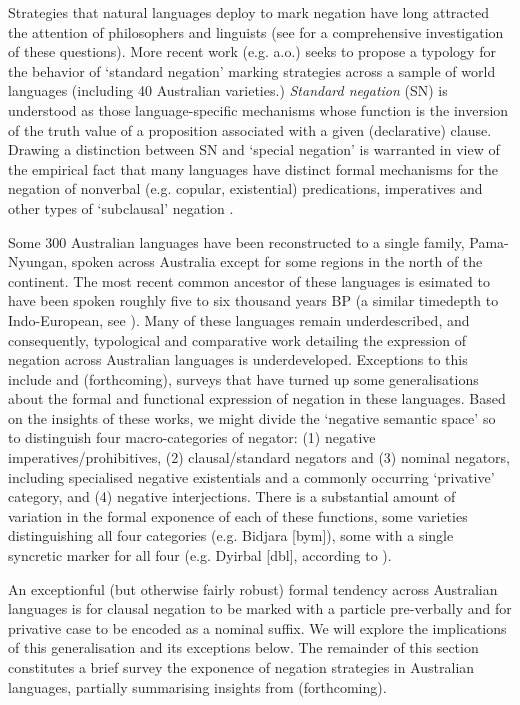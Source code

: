 \documentclass[usenames,dvipsnames,11pt]{article}
\begin{document}
{Strategies that natural languages deploy to mark negation have long attracted the attention of philosophers and linguists (see \citealt{Horn1989} for a comprehensive investigation of these questions). More recent work (e.g. \citealt{Miestamo2005} a.o.) seeks to propose a typology for the behavior of `standard negation' marking strategies across a sample of world languages (including 40 Australian varieties.) \textit{Standard negation} (SN) is understood as those language-specific mechanisms whose function is the inversion of the truth value of a proposition associated with a given (declarative) clause. Drawing a distinction between SN and `special negation' is warranted in view of the empirical fact that many languages have distinct formal mechanisms for the negation of nonverbal (e.g. copular, existential) predications, imperatives and other types of `subclausal' negation \citep{Miestamo2007,Horn2017,Veselinova2013,VanderAuwera2005}.


Some 300 Australian languages have been reconstructed to a single family, Pama-Nyungan, spoken across Australia except for some regions in the north of the continent. The most recent common ancestor of these languages is esimated to have been spoken roughly five to six thousand years \textsc{BP} (a similar timedepth to Indo-European, see \citealt[742]{Bouckaert2018}). Many of these languages remain underdescribed, and consequently, typological and comparative work detailing the expression of negation across Australian languages is underdeveloped. Exceptions to this include \citealp{Dixon2002a} and \citeauthor{PhillipsFCb} (forthcoming), surveys that have turned up some generalisations about the formal and functional expression of negation in these languages. Based on the insights of these works, we might divide the `negative semantic space' so to distinguish four macro-categories of negator: (1) negative imperatives/prohibitives, (2) clausal/standard negators and (3) nominal negators, including specialised negative existentials and a commonly occurring `privative' category, and (4) negative interjections. There is a substantial amount of variation in the formal exponence of each of these functions, some varieties distinguishing all four categories  (e.g. Bidjara [\gls{bym}]), some with a single syncretic marker for all four (e.g. Dyirbal [\gls{dbl}], according to \citealp[84--table 3.3]{Dixon2002a}). 

An exceptionful (but otherwise fairly robust) formal tendency across Australian languages is for clausal negation to be marked with a particle pre-verbally and for privative case to be encoded as a nominal suffix. We will explore the implications of this generalisation and its exceptions below. The remainder of this section constitutes a brief survey the exponence of negation strategies in Australian languages, partially summarising insights from \citeauthor{PhillipsFCb} (forthcoming).
}
\end{document}
